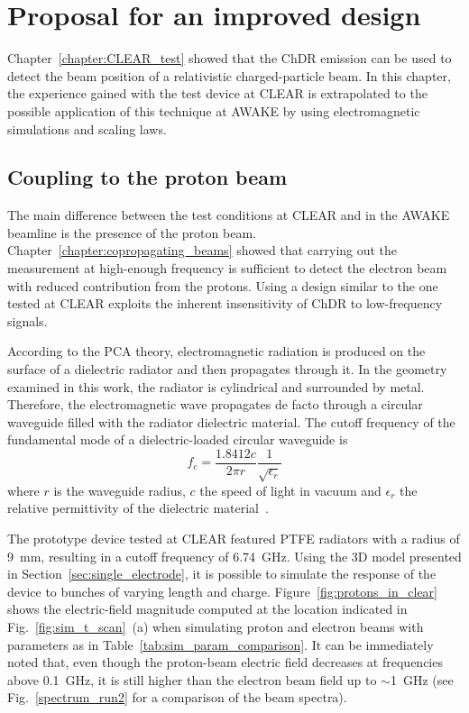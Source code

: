 \chapter[Proposal for an improved design]{Proposal for an improved design}\label{chap:new_design}

Chapter~\ref{chapter:CLEAR_test} showed that the ChDR emission can be used to detect the beam position of a relativistic charged-particle beam. In this chapter, the experience gained with the test device at CLEAR is extrapolated to the possible application of this technique at AWAKE by using electromagnetic simulations and scaling laws. 


\section[Coupling to the proton beam]{Coupling to the proton beam}

The main difference between the test conditions at CLEAR and in the AWAKE beamline is the presence of the proton beam. Chapter~\ref{chapter:copropagating_beams} showed that carrying out the measurement at high-enough frequency is sufficient to detect the electron beam with reduced contribution from the protons. Using a design similar to the one tested at CLEAR exploits the inherent insensitivity of ChDR to low-frequency signals.

According to the PCA theory, electromagnetic radiation is produced on the surface of a dielectric radiator and then propagates through it. In the geometry examined in this work, the radiator is cylindrical and surrounded by metal. Therefore, the electromagnetic wave propagates de facto through a circular waveguide filled with the radiator dielectric material. The cutoff frequency of the fundamental mode of a dielectric-loaded circular waveguide is
\begin{equation}
f_c=\frac{1.8412c}{2\pi r} \frac{1}{\sqrt{\epsilon_r}} \label{eq:cutoff_loaded}
\end{equation}
where $r$ is the waveguide radius, $c$ the speed of light in vacuum and $\epsilon_r$ the relative permittivity of the dielectric material~\cite{Jackson:490457}. 

The prototype device tested at CLEAR featured PTFE radiators with a radius of 9~mm, resulting in a cutoff frequency of 6.74~GHz. Using the 3D model presented in Section~\ref{sec:single_electrode}, it is possible to simulate the response of the device to bunches of varying length and charge. Figure~\ref{fig:protons_in_clear} shows the electric-field magnitude computed at the location indicated in Fig.~\ref{fig:sim_t_scan}~(a) when simulating proton and electron beams with parameters as in Table~\ref{tab:sim_param_comparison}. It can be immediately noted that, even though the proton-beam electric field decreases at frequencies above 0.1~GHz, it is still higher than the electron beam field up to $\sim$1~GHz (see Fig.~\ref{spectrum_run2} for a comparison of the beam spectra).




